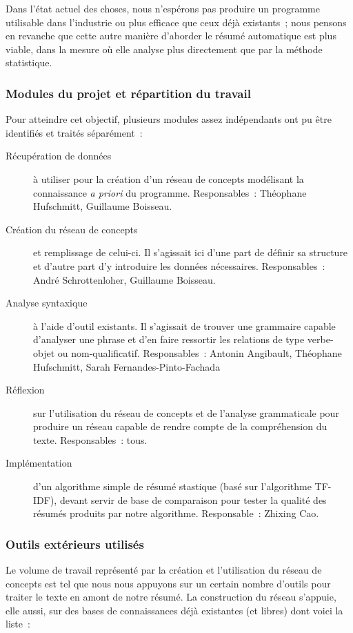 \documentclass[a4paper, 12pt]{article}
\begin{document}
Dans l'état actuel des choses, nous n'espérons pas produire un programme utilisable dans l'industrie ou plus efficace que ceux déjà existants~; nous pensons en revanche que cette autre manière d'aborder le résumé automatique est plus viable, dans la mesure où elle analyse plus directement que par la méthode statistique.

\subsubsection{Modules du projet et répartition du travail}
Pour atteindre cet objectif, plusieurs modules assez indépendants ont pu être identifiés et traités séparément~:

\begin{description}
	\item[Récupération de données] à utiliser pour la création d'un réseau de concepts modélisant la connaissance \textit{a priori} du programme. Responsables~: Théophane Hufschmitt, Guillaume Boisseau.
	\item[Création du réseau de concepts] et remplissage de celui-ci. Il s'agissait ici d'une part de définir sa structure et d'autre part d'y introduire les données nécessaires. Responsables~: André Schrottenloher, Guillaume Boisseau.
	\item[Analyse syntaxique] à l'aide d'outil existants. Il s'agissait de trouver une grammaire capable d'analyser une phrase et d'en faire ressortir les relations de type verbe-objet ou nom-qualificatif. Responsables~: Antonin Angibault, Théophane Hufschmitt, Sarah Fernandes-Pinto-Fachada
	\item[Réflexion] sur l'utilisation du réseau de concepts et de l'analyse grammaticale pour produire un réseau capable de rendre compte de la compréhension du texte. Responsables~: tous.
	\item[Implémentation] d'un algorithme simple de résumé stastique (basé sur l'algorithme TF-IDF), devant servir de base de comparaison pour tester la qualité des résumés produits par notre algorithme.  Responsable~: Zhixing Cao.
\end{description}

\subsubsection{Outils extérieurs utilisés}

Le volume de travail représenté par la création et l'utilisation du réseau de concepts est tel que nous nous appuyons sur un certain nombre d'outils pour traiter le texte en amont de notre résumé. La construction du réseau s'appuie, elle aussi, sur des bases de connaissances déjà existantes (et libres) dont voici la liste~:
\end{document}
